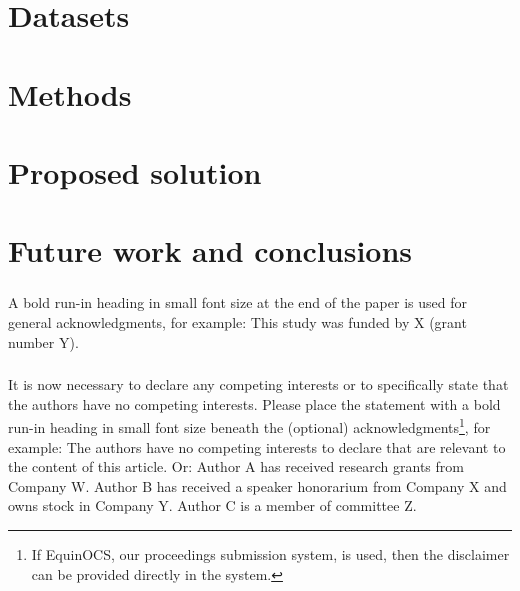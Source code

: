 \documentclass[runningheads]{llncs}
\begin{document}


\section{Datasets}
\label{sec:datasets}


\section{Methods}
\label{sec:methods}


\section{Proposed solution}
\label{sec:solution}


\section{Future work and conclusions}
\label{sec:conclusions}

\begin{credits}
\subsubsection{\ackname} A bold run-in heading in small font size at the end of the paper is
used for general acknowledgments, for example: This study was funded
by X (grant number Y).

\subsubsection{\discintname}
It is now necessary to declare any competing interests or to specifically
state that the authors have no competing interests. Please place the
statement with a bold run-in heading in small font size beneath the
(optional) acknowledgments\footnote{If EquinOCS, our proceedings submission
system, is used, then the disclaimer can be provided directly in the system.},
for example: The authors have no competing interests to declare that are
relevant to the content of this article. Or: Author A has received research
grants from Company W. Author B has received a speaker honorarium from
Company X and owns stock in Company Y. Author C is a member of committee Z.
\end{credits}
%
%
%


%
\end{document}
